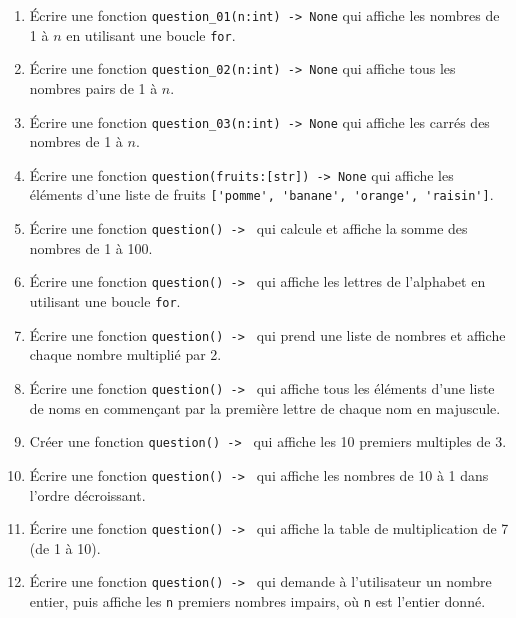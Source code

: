 
\begin{enumerate}

    \item Écrire une fonction \lstinline{question_01(n:int) -> None} qui affiche les nombres de 1 à $n$ en utilisant une boucle \lstinline{for}.

    \item Écrire une fonction \lstinline{question_02(n:int) -> None} qui affiche tous les nombres pairs de 1 à $n$.

    \item Écrire une fonction \lstinline{question_03(n:int) -> None} qui affiche les carrés des nombres de 1 à $n$.

    \item Écrire une fonction \lstinline{question(fruits:[str]) -> None} qui affiche les éléments d'une liste de fruits \lstinline{['pomme', 'banane', 'orange', 'raisin']}.

    \item Écrire une fonction \lstinline{question() -> } qui calcule et affiche la somme des nombres de 1 à 100.

    \item Écrire une fonction \lstinline{question() -> } qui affiche les lettres de l'alphabet en utilisant une boucle \lstinline{for}.

    \item Écrire une fonction \lstinline{question() -> } qui prend une liste de nombres et affiche chaque nombre multiplié par 2.

    \item Écrire une fonction \lstinline{question() -> } qui affiche tous les éléments d'une liste de noms en commençant par la première lettre de chaque nom en majuscule.

    \item Créer une fonction \lstinline{question() -> } qui affiche les 10 premiers multiples de 3.

    \item Écrire une fonction \lstinline{question() -> } qui affiche les nombres de 10 à 1 dans l'ordre décroissant.

    \item Écrire une fonction \lstinline{question() -> } qui affiche la table de multiplication de 7 (de 1 à 10).

    \item Écrire une fonction \lstinline{question() -> } qui demande à l'utilisateur un nombre entier, puis affiche les \lstinline{n} premiers nombres impairs, où \lstinline{n} est l'entier donné.


\end{enumerate}
